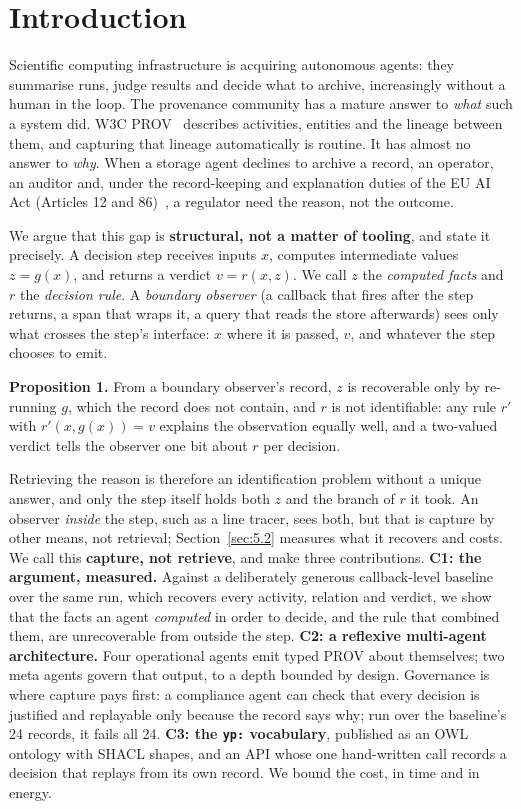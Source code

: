 \documentclass[conference]{IEEEtran}
\begin{document}
\section{Introduction}\label{sec:1}

\noindent Scientific computing infrastructure is acquiring autonomous agents: they summarise runs, judge results and decide what to archive, increasingly without a human in the loop. The provenance community has a mature answer to \emph{what} such a system did. W3C PROV~\cite{provdm} describes activities, entities and the lineage between them, and capturing that lineage automatically is routine. It has almost no answer to \emph{why}. When a storage agent declines to archive a record, an operator, an auditor and, under the record-keeping and explanation duties of the EU AI Act (Articles 12 and 86)~\cite{euaiact}, a regulator need the reason, not the outcome.

\noindent We argue that this gap is \textbf{structural, not a matter of tooling}, and state it precisely. A decision step receives inputs $x$, computes intermediate values $z = g(x)$, and returns a verdict $v = r(x, z)$. We call $z$ the \emph{computed facts} and $r$ the \emph{decision rule}. A \emph{boundary observer} (a callback that fires after the step returns, a span that wraps it, a query that reads the store afterwards) sees only what crosses the step's interface: $x$ where it is passed, $v$, and whatever the step chooses to emit.

\noindent \textbf{Proposition 1.} From a boundary observer's record, $z$ is recoverable only by re-running $g$, which the record does not contain, and $r$ is not identifiable: any rule $r'$ with $r'(x, g(x)) = v$ explains the observation equally well, and a two-valued verdict tells the observer one bit about $r$ per decision.

\noindent Retrieving the reason is therefore an identification problem without a unique answer, and only the step itself holds both $z$ and the branch of $r$ it took. An observer \emph{inside} the step, such as a line tracer, sees both, but that is capture by other means, not retrieval; Section~\ref{sec:5.2} measures what it recovers and costs. We call this \textbf{capture, not retrieve}, and make three contributions. \textbf{C1: the argument, measured.} Against a deliberately generous callback-level baseline over the same run, which recovers every activity, relation and verdict, we show that the facts an agent \emph{computed} in order to decide, and the rule that combined them, are unrecoverable from outside the step. \textbf{C2: a reflexive multi-agent architecture.} Four operational agents emit typed PROV about themselves; two meta agents govern that output, to a depth bounded by design. Governance is where capture pays first: a compliance agent can check that every decision is justified and replayable only because the record says why; run over the baseline's 24 records, it fails all 24. \textbf{C3: the \texttt{yp:\allowbreak{}} vocabulary}, published as an OWL ontology with SHACL shapes, and an API whose one hand-written call records a decision that replays from its own record. We bound the cost, in time and in energy.
\end{document}
